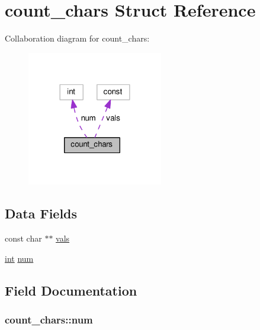 \hypertarget{structcount__chars}{}\section{count\+\_\+chars Struct Reference}
\label{structcount__chars}


Collaboration diagram for count\+\_\+chars\+:
\nopagebreak
\begin{figure}[H]
\begin{center}
\leavevmode
\includegraphics[width=168pt]{structcount__chars__coll__graph}
\end{center}
\end{figure}
\subsection*{Data Fields}
\begin{DoxyCompactItemize}
\item 
const char $\ast$$\ast$ \hyperlink{structcount__chars_a444461a0241450ff5739b709e8979244}{vals}
\item 
\hyperlink{pcre_8txt_a42dfa4ff673c82d8efe7144098fbc198}{int} \hyperlink{structcount__chars_a8f632a08dc5e8da7c385f37d1b8cdb5d}{num}
\end{DoxyCompactItemize}


\subsection{Field Documentation}
\subsubsection[{\texorpdfstring{num}{num}}]{ count\+\_\+chars\+::num}\hypertarget{structcount__chars_a8f632a08dc5e8da7c385f37d1b8cdb5d}{}\label{structcount__chars_a8f632a08dc5e8da7c385f37d1b8cdb5d}

